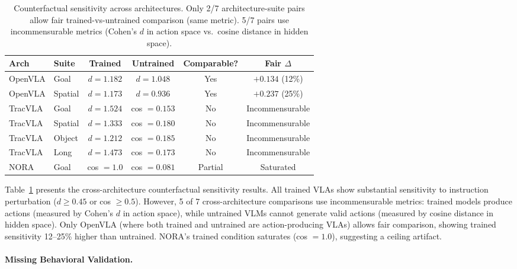 \documentclass[letterpaper]{article}
\begin{document}
\begin{table}[h]
\centering
\caption{Counterfactual sensitivity across architectures. Only 2/7 architecture-suite pairs allow fair trained-vs-untrained comparison (same metric). 5/7 pairs use incommensurable metrics (Cohen's $d$ in action space vs.\ cosine distance in hidden space).}
\label{tab:cf_sensitivity}
\begin{tabular}{llcccc}
\toprule
Arch & Suite & Trained & Untrained & Comparable? & Fair $\Delta$ \\
\midrule
OpenVLA & Goal & $d = 1.182$ & $d = 1.048$ & Yes & $+0.134$ (12\%) \\
OpenVLA & Spatial & $d = 1.173$ & $d = 0.936$ & Yes & $+0.237$ (25\%) \\
TracVLA & Goal & $d = 1.524$ & cos $= 0.153$ & No & Incommensurable \\
TracVLA & Spatial & $d = 1.333$ & cos $= 0.180$ & No & Incommensurable \\
TracVLA & Object & $d = 1.212$ & cos $= 0.185$ & No & Incommensurable \\
TracVLA & Long & $d = 1.473$ & cos $= 0.173$ & No & Incommensurable \\
NORA & Goal & cos $= 1.0$ & cos $= 0.081$ & Partial & Saturated \\
\bottomrule
\end{tabular}
\end{table}

Table~\ref{tab:cf_sensitivity} presents the cross-architecture counterfactual sensitivity results. All trained VLAs show substantial sensitivity to instruction perturbation ($d \geq 0.45$ or cos $\geq 0.5$). However, 5 of 7 cross-architecture comparisons use incommensurable metrics: trained models produce actions (measured by Cohen's $d$ in action space), while untrained VLMs cannot generate valid actions (measured by cosine distance in hidden space). Only OpenVLA (where both trained and untrained are action-producing VLAs) allows fair comparison, showing trained sensitivity 12--25\% higher than untrained. NORA's trained condition saturates (cos $= 1.0$), suggesting a ceiling artifact.

\paragraph{Missing Behavioral Validation.}
\end{document}
